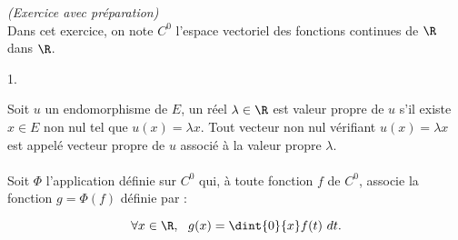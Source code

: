 \documentclass[11pt]{article}%
\begin{document}
 \begin{exercice}{\it (Exercice avec préparation)}~\\
 Dans cet exercice, on note $C^{0}$ l'espace vectoriel des fonctions
continues de $\R$ dans $\R$.
 \begin{noliste}{1.}
 \setlength{\itemsep}{4mm}
 \item Soit $u$ un endomorphisme de $E$, un réel $\lambda \in \R$ est
valeur propre de $u$ s'il existe $x \in E$ non nul tel que $u(x) =
\lambda x$. Tout vecteur non nul vérifiant $u(x) = \lambda x$ est
appelé vecteur propre de $u$ associé à la valeur propre $\lambda$. \\
\\
 Soit $\Phi$ l'application définie sur $C^{0}$ qui, à toute fonction
$f$ de $C^{0}$, associe la fonction $g = \Phi(f)$ définie par :
 
\[
 \forall x \in \R,\ \ g(x) = \dint{0}{x} f(t)\ dt.
 
\]
\end{noliste}
\end{exercice}
\end{document}
